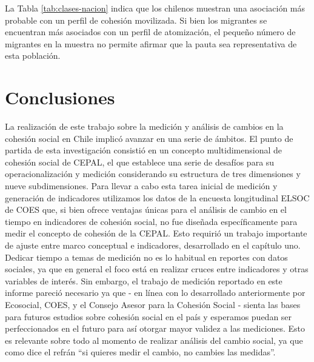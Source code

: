 \documentclass[
  12pt,
]{book}
\begin{document}
La Tabla \ref{tab:clases-nacion} indica que los chilenos muestran una asociación más probable con un perfil de cohesión movilizada. Si bien los migrantes se encuentran más asociados con un perfil de atomización, el pequeño número de migrantes en la muestra no permite afirmar que la pauta sea representativa de esta población.

\hypertarget{conclusiones}{%
\chapter*{Conclusiones}\label{conclusiones}}

La realización de este trabajo sobre la medición y análisis de cambios en la cohesión social en Chile implicó avanzar en una serie de ámbitos. El punto de partida de esta investigación consistió en un concepto multidimensional de cohesión social de CEPAL, el que establece una serie de desafíos para su operacionalización y medición considerando su estructura de tres dimensiones y nueve subdimensiones. Para llevar a cabo esta tarea inicial de medición y generación de indicadores utilizamos los datos de la encuesta longitudinal ELSOC de COES que, si bien ofrece ventajas únicas para el análisis de cambio en el tiempo en indicadores de cohesión social, no fue diseñada específicamente para medir el concepto de cohesión de la CEPAL. Esto requirió un trabajo importante de ajuste entre marco conceptual e indicadores, desarrollado en el capítulo uno. Dedicar tiempo a temas de medición no es lo habitual en reportes con datos sociales, ya que en general el foco está en realizar cruces entre indicadores y otras variables de interés. Sin embargo, el trabajo de medición reportado en este informe pareció necesario ya que - en línea con lo desarrollado anteriormente por Ecosocial, COES, y el Consejo Asesor para la Cohesión Social - sienta las bases para futuros estudios sobre cohesión social en el país y esperamos puedan ser perfeccionados en el futuro para así otorgar mayor validez a las mediciones. Esto es relevante sobre todo al momento de realizar análisis del cambio social, ya que como dice el refrán ``si quieres medir el cambio, no cambies las medidas''.
\end{document}
